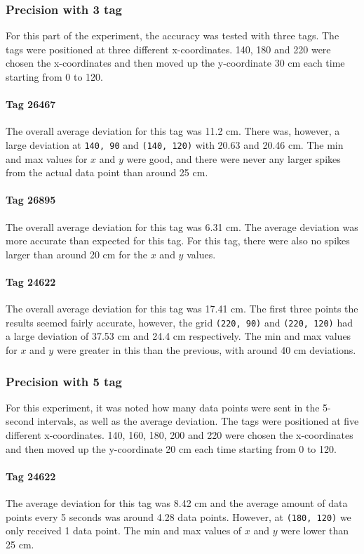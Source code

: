 \subsubsection{Precision with 3 tag}
For this part of the experiment, the accuracy was tested with three tags. 
The tags were positioned at three different x-coordinates. 
140, 180 and 220 were chosen the x-coordinates and then moved up the y-coordinate 30 cm each time starting from 0 to 120.

\paragraph{Tag 26467}
The overall average deviation for this tag was 11.2 cm.
There was, however, a large deviation at \texttt{140, 90} and \texttt{(140, 120)} with 20.63 and 20.46 cm.
The min and max values for $x$ and $y$ were good, and there were never any larger spikes from the actual data point than around 25 cm.

\paragraph{Tag 26895}
The overall average deviation for this tag was 6.31 cm.
The average deviation was more accurate than expected for this tag.
For this tag, there were also no spikes larger than around 20 cm for the $x$ and $y$ values.

\paragraph{Tag 24622}
The overall average deviation for this tag was 17.41 cm.
The first three points the results seemed fairly accurate, however, the grid \texttt{(220, 90)} and \texttt{(220, 120)} had a large deviation of 37.53 cm and 24.4 cm respectively.
The min and max values for $x$ and $y$ were greater in this than the previous, with around 40 cm deviations.

\subsubsection{Precision with 5 tag}
For this experiment, it was noted how many data points were sent in the 5-second intervals, as well as the average deviation.
The tags were positioned at five different x-coordinates. 
140, 160, 180, 200 and 220 were chosen the x-coordinates and then moved up the y-coordinate 20 cm each time starting from 0 to 120.

\paragraph{Tag 24622}
The average deviation for this tag was 8.42 cm and the average amount of data points every 5 seconds was around 4.28 data points.
However, at \texttt{(180, 120)} we only received 1 data point.
The min and max values of $x$ and $y$ were lower than 25 cm.

